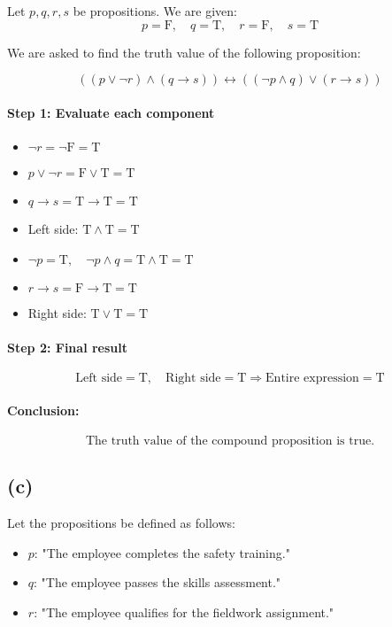 \documentclass{article}
\begin{document}
Let \( p, q, r, s \) be propositions. We are given:
\[
p = \text{F}, \quad q = \text{T}, \quad r = \text{F}, \quad s = \text{T}
\]

We are asked to find the truth value of the following proposition:

\[
((p \lor \neg r) \land (q \to s)) \leftrightarrow ((\neg p \land q) \lor (r \to s))
\]

\paragraph{Step 1: Evaluate each component}

\begin{itemize}
  \item \( \neg r = \neg \text{F} = \text{T} \)
  \item \( p \lor \neg r = \text{F} \lor \text{T} = \text{T} \)
  \item \( q \to s = \text{T} \to \text{T} = \text{T} \)
  \item Left side: \( \text{T} \land \text{T} = \text{T} \)
  \item \( \neg p = \text{T}, \quad \neg p \land q = \text{T} \land \text{T} = \text{T} \)
  \item \( r \to s = \text{F} \to \text{T} = \text{T} \)
  \item Right side: \( \text{T} \lor \text{T} = \text{T} \)
\end{itemize}

\paragraph{Step 2: Final result}

\[
\text{Left side} = \text{T}, \quad \text{Right side} = \text{T}
\Rightarrow \text{Entire expression} = \text{T}
\]

\paragraph{Conclusion:}
\[
\boxed{\text{The truth value of the compound proposition is true.}}
\]

\subsection*{(c)}

Let the propositions be defined as follows:

\begin{itemize}
  \item \( p \): "The employee completes the safety training."
  \item \( q \): "The employee passes the skills assessment."
  \item \( r \): "The employee qualifies for the fieldwork assignment."
\end{itemize}
\end{document}
